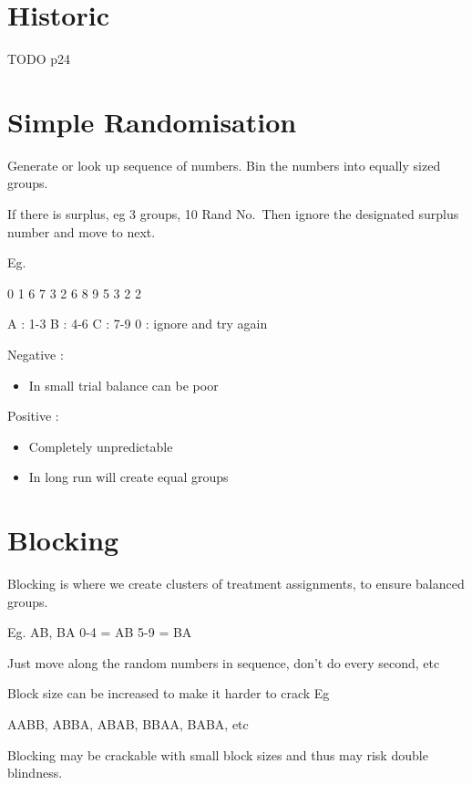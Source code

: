 \documentclass[
  letterpaper,
  DIV=11,
  numbers=noendperiod]{scrreprt}
\providecommand{\tightlist}{%
  \setlength{\itemsep}{0pt}\setlength{\parskip}{0pt}}\usepackage{longtable,booktabs,array}
\begin{document}
\hypertarget{historic}{%
\section{Historic}\label{historic}}

TODO p24

\hypertarget{simple-randomisation}{%
\section{Simple Randomisation}\label{simple-randomisation}}

Generate or look up sequence of numbers. Bin the numbers into equally
sized groups.

If there is surplus, eg 3 groups, 10 Rand No.~Then ignore the designated
surplus number and move to next.

Eg.

0 1 6 7 3 2 6 8 9 5 3 2 2

A : 1-3 B : 4-6 C : 7-9 0 : ignore and try again

Negative :

\begin{itemize}
\tightlist
\item
  In small trial balance can be poor
\end{itemize}

Positive :

\begin{itemize}
\tightlist
\item
  Completely unpredictable
\item
  In long run will create equal groups
\end{itemize}

\hypertarget{blocking}{%
\section{Blocking}\label{blocking}}

Blocking is where we create clusters of treatment assignments, to ensure
balanced groups.

Eg. AB, BA 0-4 = AB 5-9 = BA

Just move along the random numbers in sequence, don't do every second,
etc

Block size can be increased to make it harder to crack Eg

AABB, ABBA, ABAB, BBAA, BABA, etc

Blocking may be crackable with small block sizes and thus may risk
double blindness.
\end{document}

